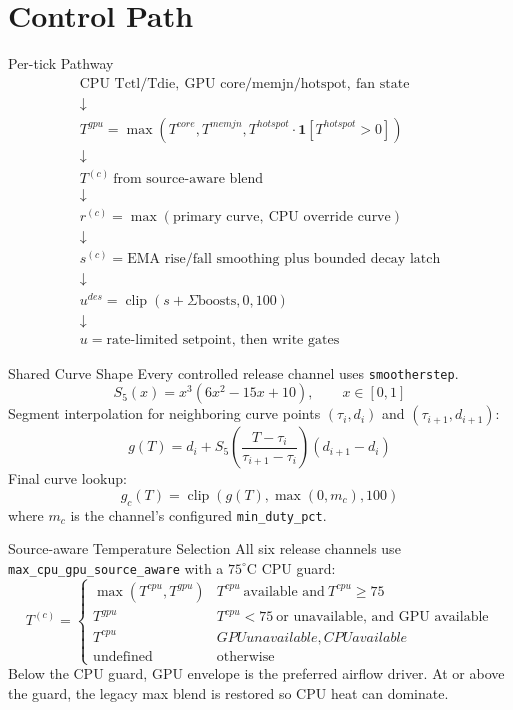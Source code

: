 \documentclass[aspectratio=169]{beamer}
\newcommand{\cfg}{\texttt}
\newcommand{\clip}{\operatorname{clip}}
\begin{document}
\section{Control Path}

\begin{frame}{Per-tick Pathway}
  \[
  \begin{array}{c}
  \text{CPU Tctl/Tdie},\ \text{GPU core/memjn/hotspot},\ \text{fan state} \\
  \downarrow \\
  T^{gpu}=\max(T^{core},T^{memjn},
    T^{hotspot}\cdot\mathbf{1}[T^{hotspot}>0]) \\
  \downarrow \\
  T^{(c)}\ \text{from source-aware blend} \\
  \downarrow \\
  r^{(c)}=\max(\text{primary curve},\ \text{CPU override curve}) \\
  \downarrow \\
  s^{(c)}=\text{EMA rise/fall smoothing plus bounded decay latch} \\
  \downarrow \\
  u^{des}=\clip(s+\Sigma \text{boosts},0,100) \\
  \downarrow \\
  u=\text{rate-limited setpoint, then write gates}
  \end{array}
  \]
\end{frame}

\begin{frame}{Shared Curve Shape}
  Every controlled release channel uses \cfg{smootherstep}.
  \[
    S_5(x)=x^3(6x^2-15x+10), \qquad x \in [0,1]
  \]
  Segment interpolation for neighboring curve points
  $(\tau_i,d_i)$ and $(\tau_{i+1},d_{i+1})$:
  \[
    g(T)=d_i + S_5\left(\frac{T-\tau_i}{\tau_{i+1}-\tau_i}\right)
      (d_{i+1}-d_i)
  \]
  Final curve lookup:
  \[
    g_c(T)=\clip(g(T),\max(0,m_c),100)
  \]
  where $m_c$ is the channel's configured \cfg{min\_duty\_pct}.
\end{frame}

\begin{frame}{Source-aware Temperature Selection}
  All six release channels use
  \cfg{max\_cpu\_gpu\_source\_aware} with a $75^\circ$C CPU guard:
  \[
  T^{(c)} =
  \begin{cases}
    \max(T^{cpu},T^{gpu}) & T^{cpu}\ \text{available and}\ T^{cpu}\ge 75 \\
    T^{gpu} & T^{cpu}<75\ \text{or unavailable, and GPU available} \\
    T^{cpu} & GPU unavailable, CPU available \\
    \mathrm{undefined} & \text{otherwise}
  \end{cases}
  \]
  Below the CPU guard, GPU envelope is the preferred airflow driver. At or
  above the guard, the legacy max blend is restored so CPU heat can dominate.
\end{frame}
\end{document}
